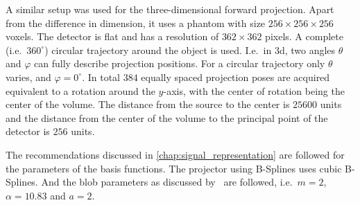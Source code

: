 A similar setup was used for the three-dimensional forward projection. Apart from the difference in
dimension, it uses a phantom with size \(256 \times 256 \times 256\) voxels. The detector is flat
and has a resolution of \(362 \times 362\) pixels. A complete (i.e.\ \(360^\circ\)) circular
trajectory around the object is used. I.e.\ in \(3\)d, two angles \(\theta\) and \(\varphi\) can
fully describe projection positions. For a circular trajectory only \(\theta\) varies, and \(\varphi
= 0^\circ\). In total \(384\) equally spaced projection poses are acquired equivalent to a rotation
around the \(y\)-axis, with the center of rotation being the center of the volume. The distance from
the source to the center is \(25600\) units and the distance from the center of the volume to the
principal point of the detector is \(256\) units.

The recommendations discussed in \autoref{chap:signal_representation} are followed for the
parameters of the basis functions. The projector using B-Splines uses cubic B-Splines. And the blob
parameters as discussed by~\cite{levakhina_three-dimensional_2014} are followed, i.e.\ \(m = 2\),
\(\alpha = 10.83\) and \(a = 2\).

